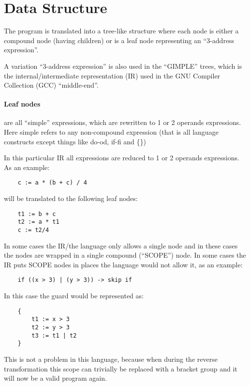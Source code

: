 \section{Data Structure}
The program is translated into a tree-like structure where each node
is either a compound node (having children) or is a leaf node representing
an ``3-address expression''.

  A variation ``3-address expression'' is also used in the ``GIMPLE'' trees,
which is the internal/intermediate representation (IR) used in the GNU Compiler
Collection (GCC) ``middle-end''.

\paragraph*{Leaf nodes}
are all ``simple'' expressions, which are rewritten to 1 or 2 operands expressions. Here
simple refers to any non-compound expression (that is all language constructs
except things like do-od, if-fi and \{\})

In this particular IR all expressions are reduced to 1 or 2 operands expressions.
As an example:

\begin{lstlisting}
	c := a * (b + c) / 4
\end{lstlisting}
	
will be translated to the following leaf nodes:

\begin{lstlisting}
	t1 := b + c
	t2 := a * t1
	c := t2/4
\end{lstlisting}
	
In some cases the IR/the language only allows a single node and in these cases
the nodes are wrapped in a single compound (``SCOPE'') node. In some cases the
IR puts SCOPE nodes in places the language would not allow it, as an example:

\begin{lstlisting}
	if ((x > 3) | (y > 3)) -> skip if
\end{lstlisting}

In this case the guard would be represented as:

\begin{lstlisting}
	{
		t1 := x > 3
		t2 := y > 3
		t3 := t1 | t2
	}
\end{lstlisting}

This is not a problem in this language, because when during the reverse transformation
this scope can trivially be replaced with a bracket group and it will now be a valid
program again.

